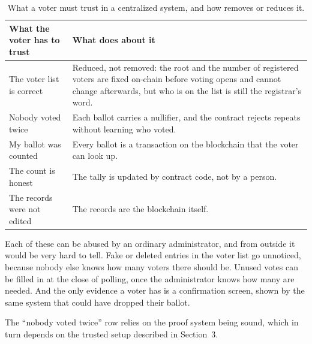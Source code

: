 \begin{table}[htbp]
  \centering
  \caption{What a voter must trust in a centralized system, and how \projectname{} removes or reduces it.}
  \label{tab:trust}
  \begin{tabular}{@{}L{6.0cm}L{9.7cm}@{}}
    \toprule
    \textbf{What the voter has to trust} & \textbf{What \projectname{} does about it}                                                                      \\
    \midrule
    The voter list is correct
                                            & Reduced, not removed: the root and the number of registered voters are
                                              fixed on-chain before voting opens and cannot change afterwards, but
                                              who is on the list is still the registrar's word.            \\
    Nobody voted twice
                                            & Each ballot carries a nullifier, and the contract rejects repeats without learning who voted. \\
    My ballot was counted
                                            & Every ballot is a transaction on the blockchain that the voter can look up.                                \\
    The count is honest
                                            & The tally is updated by contract code, not by a person.                                               \\
    The records were not edited
                                            & The records are the blockchain itself.                                                                                       \\
    \bottomrule
  \end{tabular}
\end{table}

Each of these can be abused by an ordinary administrator, and from outside it
would be very hard to tell. Fake or deleted entries in the voter list go
unnoticed, because nobody else knows how many voters there should be. Unused
votes can be filled in at the close of polling, once the administrator knows
how many are needed. And the only evidence a voter has is a confirmation
screen, shown by the same system that could have dropped their ballot.

The ``nobody voted twice'' row relies on the proof system being sound, which in
turn depends on the trusted setup described in Section~3.

